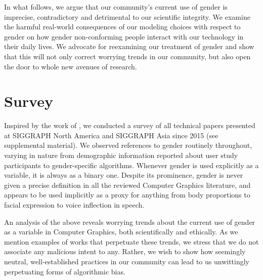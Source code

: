 \documentclass[sigconf,review,balance=false]{acmart}
\begin{document}
In what follows, we argue that our community's current use of gender is
imprecise, contradictory and detrimental to our scientific integrity.
We examine the harmful real-world consequences of our modeling
choices with respect to gender on how gender non-conforming people interact with
our technology in their daily lives. We advocate for reexamining our
treatment of gender and show that this will not only correct worrying trends in
our community, but also open the door to whole new avenues of research.

\section{Survey}


Inspired by the work of \citet{keyes2018misgendering}, we conducted a survey of
all technical papers presented at SIGGRAPH North America and SIGGRAPH Asia since
2015 (see supplemental material). We observed references to gender routinely
throughout, varying in nature from demographic information reported about user
study participants to gender-specific algorithms. Whenever gender is used
explicitly as a variable, it is always as a binary one. Despite its prominence,
gender is never given a precise definition in all the reviewed Computer Graphics
literature, and appears to be used implicitly as a proxy for anything from body
proportions to facial expression to voice inflection in speech.

An analysis of the above reveals worrying trends about the current use of gender
as a variable in Computer Graphics, both scientifically and ethically. As we
mention examples of works that perpetuate these trends, we stress that we do not
associate any malicious intent to any.  Rather, we wish to show how seemingly
neutral, well-established practices in our community can lead to us unwittingly
perpetuating forms of algorithmic bias.
\end{document}

